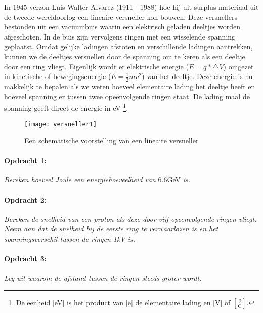 In 1945 verzon Luis Walter Alvarez (1911 - 1988) hoe hij uit surplus
materiaal uit de tweede wereldoorlog een lineaire versneller kon bouwen.
Deze versnellers bestonden uit een vacuumbuis waarin een elektrisch
geladen deeltjes worden afgeschoten. In de buis zijn vervolgens ringen
met een wisselende spanning geplaatst. Omdat gelijke ladingen afstoten
en verschillende ladingen aantrekken, kunnen we de deeltjes versnellen
door de spanning om te keren als een deeltje door een ring vliegt.
Eigenlijk wordt er elektrische energie ($E=q*\triangle V$) omgezet in
kinetische of bewegingsenergie ($E=\frac{1}{2}mv^{2}$) van het deeltje.
Deze energie is nu makkelijk te bepalen als we weten hoeveel elementaire
lading het deeltje heeft en hoeveel spanning er tussen twee
opeenvolgende ringen staat. De lading maal de spanning geeft direct de
energie in eV \footnote{De eenheid {[}eV{]} is het product van {[}e{]}
de elementaire lading en {[}V{]} of
$\left[\mathrm{\frac{J}{C}}\right]$.}.

\begin{figure}[h]
\noindent \begin{centering}
\texttt{[image: versneller1]}
\par\end{centering}

\caption{Een schematische voorstelling van een lineaire versneller}
\end{figure}


\paragraph*{Opdracht 1:}

\emph{Bereken hoeveel Joule een energiehoeveelheid van }6.6GeV\emph{
is.}


\paragraph*{Opdracht 2:}

\emph{Bereken de snelheid van een proton als deze door vijf opeenvolgende
ringen vliegt. Neem aan dat de snelheid bij de eerste ring te verwaarlozen
is en het spanningsverschil tussen de ringen 1kV is.}


\paragraph*{Opdracht 3:}

\emph{Leg uit waarom de afstand tussen de ringen steeds groter wordt.}

